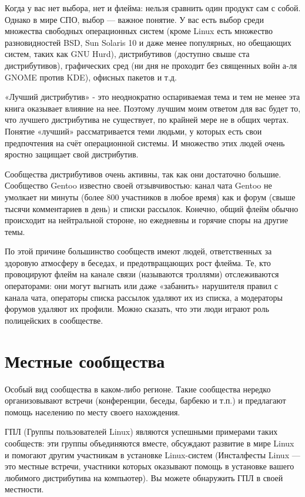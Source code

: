 \documentclass[12pt]{book}
\begin{document}
Когда у вас нет выбора, нет и флейма: нельзя сравнить один продукт сам с собой. Однако в мире СПО, выбор — важное понятие. У вас есть выбор среди множества свободных операционных систем (кроме Linux есть множество разновидностей BSD, Sun Solaris 10 и даже менее популярных, но обещающих систем, таких как GNU Hurd), дистрибутивов (доступно свыше ста дистрибутивов), графических сред (ни дня не проходит без священных войн  а-ля GNOME против KDE), офисных пакетов и т.д.

«Лучший дистрибутив» - это неоднократно оспариваемая тема и тем не менее эта книга оказывает влияние на нее. Поэтому лучшим моим ответом для вас будет то, что лучшего дистрибутива не существует, по крайней мере не в общих чертах. Понятие «лучший» рассматривается теми людьми, у которых есть свои предпочтения на счёт операционной системы. И множество этих людей очень яростно защищает свой дистрибутив. 

Сообщества дистрибутивов очень активны, так как они достаточно большие. Сообщество Gentoo известно своей отзывчивостью: канал чата Gentoo не умолкает ни минуты (более 800 участников в любое время) как и форум (свыше тысячи комментариев в день) и списки рассылок. Конечно, общий флейм обычно происходит на нейтральной стороне, но ежедневны и горячие споры на другие темы. 

По этой причине большинство сообществ имеют людей, ответственных за здоровую атмосферу в беседах, и предотвращающих рост флейма. Те, кто провоцируют флейм на канале связи (называются троллями) отслеживаются операторами: они могут выгнать или даже «забанить» нарушителя правил с канала чата, операторы списка рассылок удаляют их из списка, а модераторы форумов удаляют их профили. Можно сказать, что эти люди играют роль полицейских в сообществе. 

\section{Местные сообщества}

Особый вид сообщества в каком-либо регионе. Такие сообщества нередко организовывают встречи (конференции, беседы, барбекю и т.п.) и предлагают помощь населению по месту своего нахождения. 

ГПЛ (Группы пользователей Linux) являются успешными примерами таких сообществ: эти группы объединяются вместе, обсуждают развитие в мире Linux и помогают другим участникам в установке Linux-систем (Инсталфесты Linux — это местные встречи, участники которых оказывают помощь в установке вашего любимого дистрибутива на компьютер). Вы можете обнаружить ГПЛ в своей местности. 
\end{document}
